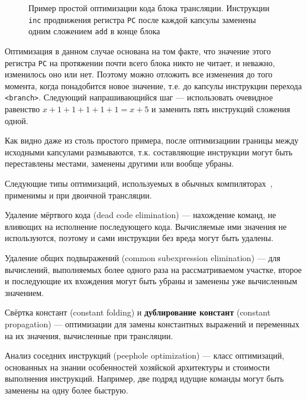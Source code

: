 \begin{figure}[htp]
    \centering
    \caption[Оптимизация при ДТ]{Пример простой оптимизации кода блока трансляции. Инструкции \texttt{inc} продвижения регистра \texttt{PC} после каждой капсулы заменены одним сложением \texttt{add} в конце блока}
    \label{fig:bt-optimization}
\end{figure}

Оптимизация в данном случае основана на том факте, что значение этого регистра \texttt{PC} на протяжении почти всего блока никто не читает, и неважно, изменилось оно или нет. Поэтому можно отложить все изменения до того  момента, когда понадобится новое значение, т.е. до капсулы  инструкции перехода \texttt{<branch>}. Следующий напрашивающийся шаг — использовать очевидное равенство $x+1+1+1+1+1 = x +5$ и заменить пять инструкций сложения одной.

Как видно даже из столь простого примера, после оптимизациии границы между исходными капсулами размываются, т.к. составляющие инструкции могут быть переставлены местами, заменены другими или вообще убраны. 

Следующие типы оптимизаций, используемых в обычных компиляторах~\cite{dragonbook}, применимы и при двоичной трансляции.

\begin{description*}
\item[Удаление мёртвого кода] (\abbr dead code elimination) — нахождение команд, не влияющих на исполнение последующего кода. Вычисляемые ими значения не используются, поэтому и сами инструкции без вреда могут быть удалены.
\item[Удаление общих подвыражений] (\abbr common subexpression elimination) —  для вычислений, выполняемых более одного раза на рассматриваемом участке, второе и последующие их вхождения могут быть убраны и заменены уже вычисленным значением.
\item[Свёртка констант] (\abbr constant folding) и \textbf{дублирование констант} (\abbr constant propagation) — оптимизации для замены константных выражений и переменных на их значения, вычисленные при трансляции.
\item[Анализ соседних инструкций] (\abbr peephole optimization) — класс оптимизаций, основанных на знании особенностей хозяйской архитектуры и стоимости выполнения инструкций. Например, две подряд идущие команды могут быть заменены на одну более быструю.
\end{description*}

